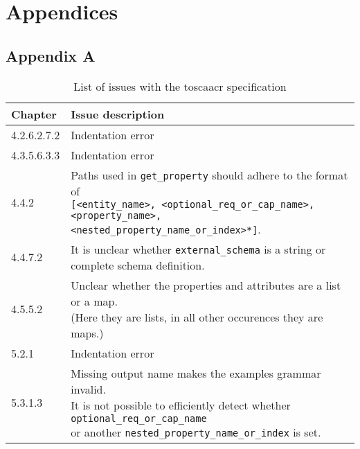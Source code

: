 \chapter*{Appendices}
\label{label:appendices}

\section*{Appendix A}
\begin{table}[H]
  \caption{List of issues with the \gls{toscaacr} specification}
  \begin{tabular}{ | l | l | }
    \hline
    Chapter & Issue description \\
    \hline \hline
    \hline
    4.2.6.2.7.2 & Indentation error \\
    4.3.5.6.3.3 & Indentation error \\
    \hline
    4.4.2 & \makecell{Paths used in \texttt{get_property} should adhere to the format of \\ \texttt{[<entity_name>, <optional_req_or_cap_name>, <property_name>,} \\ \texttt{<nested_property_name_or_index>*]}.} \\
    \hline
    4.4.7.2 & \makecell{It is unclear whether \texttt{external_schema} is a string or \\ complete schema definition.} \\
    \hline
    4.5.5.2 & \makecell{Unclear whether the properties and attributes are a list or a map. \\ (Here they are lists, in all other occurences they are maps.)} \\
    \hline
    5.2.1 & Indentation error \\
    \hline
    5.3.1.3 & \makecell{Missing output name makes the examples grammar invalid. \\ It is not possible to efficiently detect whether \texttt{optional_req_or_cap_name} \\ or another \texttt{nested_property_name_or_index} is set.} \\
    \hline
  \end{tabular}
  \label{tab:tosca_issues}
\end{table}


